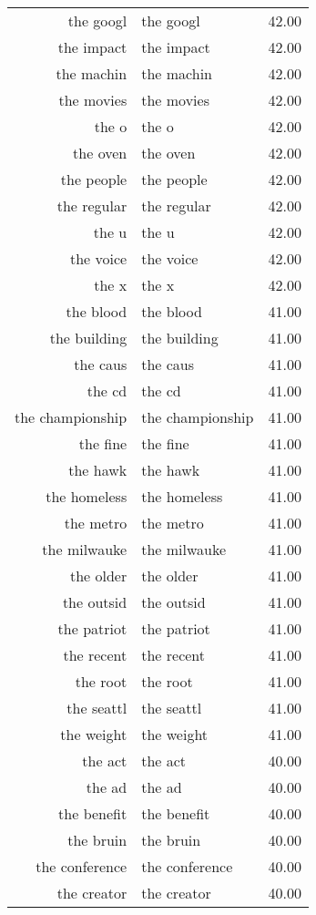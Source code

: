 \begin{table}[ht]
\begin{tabular}{rlr}
  the googl & the googl & 42.00 \\ 
  the impact & the impact & 42.00 \\ 
  the machin & the machin & 42.00 \\ 
  the movies & the movies & 42.00 \\ 
  the o & the o & 42.00 \\ 
  the oven & the oven & 42.00 \\ 
  the people & the people & 42.00 \\ 
  the regular & the regular & 42.00 \\ 
  the u & the u & 42.00 \\ 
  the voice & the voice & 42.00 \\ 
  the x & the x & 42.00 \\ 
  the blood & the blood & 41.00 \\ 
  the building & the building & 41.00 \\ 
  the caus & the caus & 41.00 \\ 
  the cd & the cd & 41.00 \\ 
  the championship & the championship & 41.00 \\ 
  the fine & the fine & 41.00 \\ 
  the hawk & the hawk & 41.00 \\ 
  the homeless & the homeless & 41.00 \\ 
  the metro & the metro & 41.00 \\ 
  the milwauke & the milwauke & 41.00 \\ 
  the older & the older & 41.00 \\ 
  the outsid & the outsid & 41.00 \\ 
  the patriot & the patriot & 41.00 \\ 
  the recent & the recent & 41.00 \\ 
  the root & the root & 41.00 \\ 
  the seattl & the seattl & 41.00 \\ 
  the weight & the weight & 41.00 \\ 
  the act & the act & 40.00 \\ 
  the ad & the ad & 40.00 \\ 
  the benefit & the benefit & 40.00 \\ 
  the bruin & the bruin & 40.00 \\ 
  the conference & the conference & 40.00 \\ 
  the creator & the creator & 40.00 \\ 

\end{tabular}
\end{table}
